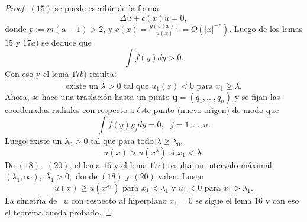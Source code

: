 



\begin{proof}
$\left(  15\right)  $ se puede escribir de la forma
\[
\Delta u+c\left(  x\right)  u=0,
\]
donde $p:=m\left(  \alpha-1\right)  >2$, y $c\left(  x\right)  =\frac{g\left(
u\left(  x\right)  \right)  }{u\left(  x\right)  }=O\left(  \left\vert
x\right\vert ^{-p}\right)  .$ Luego de los lemas $15$ y $17a)$ se deduce que
\begin{equation}
\int f\left(  y\right)  dy>0.\tag{17}%
\end{equation}
Con eso y el lema $17b)$ resulta:
\begin{equation}
\text{existe un }\widetilde{\lambda}>0\text{ \ \ tal que \ \ }u_{1}\left(
x\right)  <0\text{ para }x_{1}\geq\widetilde{\lambda}\text{.}\tag{18}%
\end{equation}
Ahora, se hace una traslaci\'{o}n hasta un punto $\mathbf{q=}\left(
q_{1},...,q_{n}\right)  $ y se fijan las coordenadas radiales con respecto a
\'{e}ste punto (nuevo origen) de modo que
\begin{equation}
\int f\left(  y\right)  y_{j}dy=0,\text{ \ \ }j=1,...,n.\tag{19}%
\end{equation}
Luego existe un $\lambda_{0}>0$ tal que para todo $\lambda\geq\lambda_{0},$
\begin{equation}
u\left(  x\right)  >u\left(  x^{\lambda}\right)  \text{ \ \ si }x_{1}%
<\lambda\text{.}\tag{20}%
\end{equation}
De $\left(  18\right)  ,$ $\left(  20\right)  $, el lema $16$ y el lema $17c)$
resulta un intervalo m\'{a}ximal $\left(  \lambda_{1},\infty\right)  ,$
$\lambda_{1}>0,$ donde $\left(  18\right)  $ y $\left(  20\right)  $ valen.
Luego
\[
u\left(  x\right)  \geq u\left(  x^{\lambda_{1}}\right)  \text{ para\ }%
x_{1}<\lambda_{1}\text{ \ \ y \ \ }u_{1}<0\text{ para }x_{1}>\lambda
_{1}\text{.}%
\]
La simetr\'{\i}a de \ $u$ con respecto al hiperplano $x_{1}=0$ se sigue el
lema $16$ y con eso el teorema queda probado.
\end{proof}
